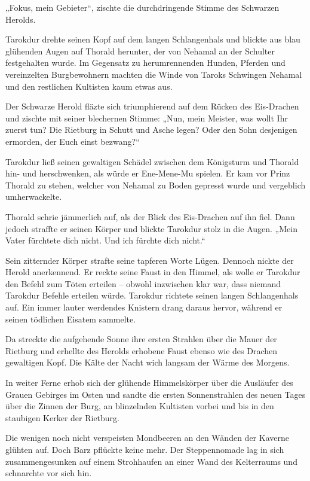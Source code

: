 „Fokus, mein Gebieter“, zischte die durchdringende Stimme des Schwarzen Herolds.

Tarokdur drehte seinen Kopf auf dem langen Schlangenhals und blickte aus blau glühenden Augen auf Thorald herunter, der von Nehamal an der Schulter festgehalten wurde. Im Gegensatz zu herumrennenden Hunden, Pferden und vereinzelten Burgbewohnern machten die Winde von Taroks Schwingen Nehamal und den restlichen Kultisten kaum etwas aus.

Der Schwarze Herold fläzte sich triumphierend auf dem Rücken des Eis-Drachen und zischte mit seiner blechernen Stimme: „Nun, mein Meister, was wollt Ihr zuerst tun? Die Rietburg in Schutt und Asche legen? Oder den Sohn desjenigen ermorden, der Euch einst bezwang?“

Tarokdur ließ seinen gewaltigen Schädel zwischen dem Königsturm und Thorald hin- und herschwenken, als würde er Ene-Mene-Mu spielen. Er kam vor Prinz Thorald zu stehen, welcher von Nehamal zu Boden gepresst wurde und vergeblich umherwackelte.

Thorald schrie jämmerlich auf, als der Blick des Eis-Drachen auf ihn fiel. Dann jedoch straffte er seinen Körper und blickte Tarokdur stolz in die Augen. „Mein Vater fürchtete dich nicht. Und ich fürchte dich nicht.“

Sein zitternder Körper strafte seine tapferen Worte Lügen. Dennoch nickte der Herold anerkennend. Er reckte seine Faust in den Himmel, als wolle er Tarokdur den Befehl zum Töten erteilen – obwohl inzwischen klar war, dass niemand Tarokdur Befehle erteilen würde. Tarokdur richtete seinen langen Schlangenhals auf. Ein immer lauter werdendes Knistern drang daraus hervor, während er seinen tödlichen Eisatem sammelte.

Da streckte die aufgehende Sonne ihre ersten Strahlen über die Mauer der Rietburg und erhellte des Herolds erhobene Faust ebenso wie des Drachen gewaltigen Kopf. Die Kälte der Nacht wich langsam der Wärme des Morgens.

In weiter Ferne erhob sich der glühende Himmelskörper über die Ausläufer des Grauen Gebirges im Osten und sandte die ersten Sonnenstrahlen des neuen Tages über die Zinnen der Burg, an blinzelnden Kultisten vorbei und bis in den staubigen Kerker der Rietburg.

Die wenigen noch nicht verspeisten Mondbeeren an den Wänden der Kaverne glühten auf. Doch Barz pflückte keine mehr. Der Steppennomade lag in sich zusammengesunken auf einem Strohhaufen an einer Wand des Kelterraums und schnarchte vor sich hin.

